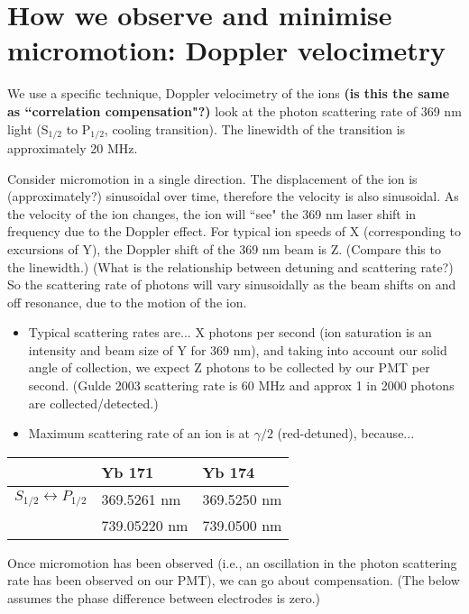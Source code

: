 \documentclass{article}
\begin{document}
\section{How we observe and minimise micromotion: Doppler velocimetry}

We use a specific technique, Doppler velocimetry of the ions \textbf{(is this the same as ``correlation compensation"?)} look at the photon scattering rate of 369 nm light (S$_{1/2}$ to P$_{1/2}$, cooling transition). The linewidth of the transition is approximately 20 MHz.  

Consider micromotion in a single direction. The displacement of the ion is (approximately?) sinusoidal over time, therefore the velocity is also sinusoidal. As the velocity of the ion changes, the ion will ``see" the 369 nm laser shift in frequency due to the Doppler effect. For typical ion speeds of X (corresponding to excursions of Y), the Doppler shift of the 369 nm beam is Z. (Compare this to the linewidth.) (What is the relationship between detuning and scattering rate?) So the scattering rate of photons will vary sinusoidally as the beam shifts on and off resonance, due to the motion of the ion.

\begin{itemize}
\item Typical scattering rates are... X photons per second (ion saturation is an intensity and beam size of Y for 369 nm), and taking into account our solid angle of collection, we expect Z photons to be collected by our PMT per second. (Gulde 2003 scattering rate is 60 MHz and approx 1 in 2000 photons are collected/detected.)
\item Maximum scattering rate of an ion is at $\gamma /2$ (red-detuned), because...
\end{itemize}

\vspace{0mm}
\begin{center}
\begin{tabular}{l l l} \toprule
& \textbf{Yb 171} & \textbf{Yb 174} \\ \midrule
$S_{1/2} \leftrightarrow P_{1/2}$ & 369.5261 nm & 369.5250 nm \\
 & 739.05220 nm & 739.0500 nm \\  
\bottomrule
\end{tabular}
\end{center}

Once micromotion has been observed (i.e., an oscillation in the photon scattering rate has been observed on our PMT), we can go about compensation. (The below assumes the phase difference between electrodes is zero.)
\end{document}
